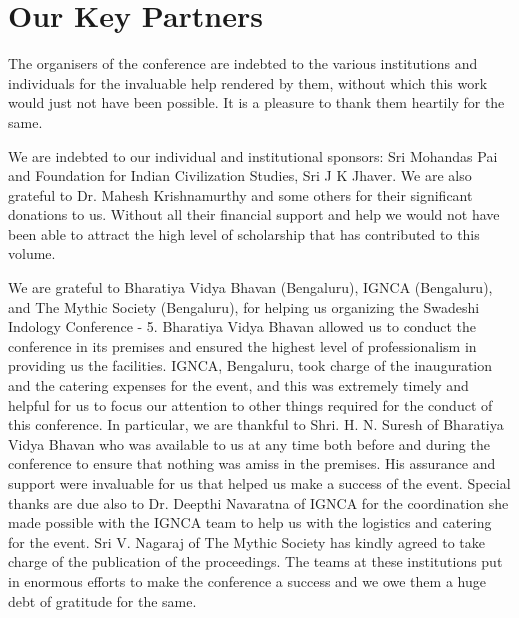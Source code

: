 
\chapter*{Our Key Partners}\label{keypartners}

\vspace{-.5cm}

The organisers of the conference are indebted to the various institutions and individuals for the invaluable help rendered by them, without which this work would just not have been possible. It is a pleasure to thank them heartily for the same.

We are indebted to our individual and institutional sponsors: Sri Mohandas Pai and Foundation for Indian Civilization Studies, Sri J K Jhaver. We are also grateful to Dr. Mahesh Krishnamurthy and some others for their significant donations to us. Without all their financial support and help we would not have been able to attract the high level of scholarship that has contributed to this volume.

We are grateful to Bharatiya Vidya Bhavan (Bengaluru), IGNCA (Bengaluru), and The Mythic Society (Bengaluru), for helping us organizing the Swadeshi Indology Conference - 5. Bharatiya Vidya Bhavan allowed us to conduct the conference in its premises and ensured the highest level of professionalism in providing us the facilities. IGNCA, Bengaluru, took charge of the inauguration and the catering expenses for the event, and this was extremely timely and helpful for us to focus our attention to other things required for the conduct of this conference. In particular, we are thankful to Shri. H. N. Suresh of Bharatiya Vidya Bhavan who was available to us at any time both before and during the conference to ensure that nothing was amiss in the premises. His assurance and support were invaluable for us that helped us make a success of the event. Special thanks are due also to Dr. Deepthi Navaratna of IGNCA for the coordination she made possible with the IGNCA team to help us with the logistics and catering for the event. Sri V. Nagaraj of The Mythic Society has kindly agreed to take charge of the publication of the proceedings. The teams at these institutions put in enormous efforts to make the conference a success and we owe them a huge debt of gratitude for the same. 

